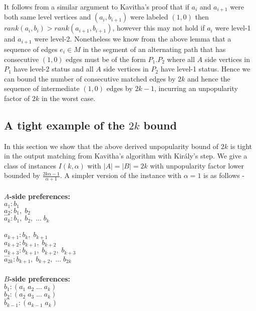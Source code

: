 \documentclass[a4paper,10pt]{article}
\theoremstyle{plain} %
\theoremstyle{plain} %
\begin{document}
It follows from a similar argument to Kavitha's proof that if $a_i$ and $a_{i+1}$ were both same level vertices and $(a_i, b_{i+1})$ were labeled $(1, 0)$ then $rank(a_i, b_i) > rank(a_{i+1}, b_{i+1})$, however this may not hold if $a_i$ were level-1 and $a_{i+1}$ were level-2. Nonetheless we know from the above lemma that a sequence of edges $e_i \in M$ in the segment of an alternating path that has consecutive $(1, 0)$ edges must be of the form $P_1.P_2$ where all $A$ side vertices in $P_1$ have level-2 status and all $A$ side vertices in $P_2$ have level-1 status. Hence we can bound the number of consecutive matched edges by $2k$ and hence the sequence of intermediate $(1, 0)$ edges by $2k-1$, incurring an unpopularity factor of $2k$ in the worst case.

 \subsection{A tight example of the $2k$ bound}
In this section we show that the above derived unpopularity bound of $2k$ is tight in the output matching from Kavitha's algorithm with Király's step. We give a class of instances $I(k, \alpha)$ with $|A| = |B| = 2k$ with unpopularity factor lower bounded by $\frac{2k\alpha - 1}{\alpha + 1}$. A simpler version of the instance with $\alpha = 1$ is as follows -
\\ \\
\textbf{$A$-side preferences:} \\
$a_{1}: b_{1}$ \\
$a_{2}: b_{1}, \; b_{2}$ \\
$...$ \\
$a_{k}: b_{1}, \; b_{2}, \; ... \; b_{k}$ 
\\ \\
$a_{k+1}: b_{k}, \; b_{k+1}$ \\
$a_{k+2}: b_{k+1}, \; b_{k+2}$ \\
$a_{k+3}: b_{k+1}, \; b_{k+2}, \; b_{k+3}$ \\
$...$ \\
$a_{2k}: b_{k+1}, \; b_{k+2}, \; ... \; b_{2k}$ 
\\ \\
\textbf{$B$-side preferences:} \\
$b_{1}: (a_{1} \; a_{2} \; ... \; a_{k})$ \\
$b_{2}: (a_{2} \; a_{3} \; ... \; a_{k})$ \\
$...$ \\
$b_{k-1}: (a_{k-1} \; a_{k})$ \\
\end{document}
